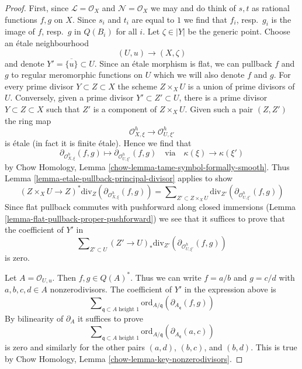 \begin{proof}
\medskip\noindent
First, since $\mathcal{L} = \mathcal{O}_X$ and $\mathcal{N} = \mathcal{O}_X$
we may and do think of $s, t$ as rational functions $f, g$ on $X$.
Since $s_i$ and $t_i$ are equal to $1$ we find that $f_i$, resp.\ $g_i$
is the image of $f$, resp.\ $g$ in $Q(B_i)$ for all $i$.
Let $\zeta \in |Y|$ be the generic point. Choose an
\'etale neighbourhood
$$
(U, u) \longrightarrow (X, \zeta)
$$
and denote $Y' = \overline{\{u\}} \subset U$.
Since an \'etale morphism is flat, we can pullback $f$ and $g$
to regular meromorphic functions on $U$ which we will also denote
$f$ and $g$.
For every prime divisor $Y \subset Z \subset X$ the scheme $Z \times_X U$
is a union of prime divisors of $U$. Conversely, given a prime divisor
$Y' \subset Z' \subset U$, there is a prime divisor
$Y \subset Z \subset X$ such that $Z'$ is a component of $Z \times_X U$.
Given such a pair $(Z, Z')$ the ring map
$$
\mathcal{O}_{X, \xi}^h \to \mathcal{O}_{U, \xi'}^h
$$
is \'etale (in fact it is finite \'etale). Hence we find that
$$
\partial_{\mathcal{O}_{X, \xi}^h}(f, g) \mapsto
\partial_{\mathcal{O}_{U, \xi'}^h}(f, g)
\quad\text{via}\quad
\kappa(\xi) \to \kappa(\xi')
$$
by Chow Homology, Lemma \ref{chow-lemma-tame-symbol-formally-smooth}.
Thus Lemma \ref{lemma-etale-pullback-principal-divisor} applies to show
$$
(Z \times_X U \to Z)^*\text{div}_Z(\partial_{\mathcal{O}_{X, \xi}^h}(f, g))
=
\sum\nolimits_{Z' \subset Z \times_X U}
\text{div}_{Z'}(\partial_{\mathcal{O}_{U, \xi'}^h}(f, g))
$$
Since flat pullback commutes with pushforward along closed
immersions (Lemma \ref{lemma-flat-pullback-proper-pushforward})
we see that it suffices to prove that the coefficient
of $Y'$ in
$$
\sum\nolimits_{Z' \subset U} 
(Z' \to U)_*\text{div}_{Z'}(\partial_{\mathcal{O}_{U, \xi'}^h}(f, g))
$$
is zero.

\medskip\noindent
Let $A = \mathcal{O}_{U, u}$. Then $f, g \in Q(A)^*$.
Thus we can write $f = a/b$ and $g = c/d$ with
$a, b, c, d \in A$ nonzerodivisors.
The coefficient of $Y'$ in the expression above is
$$
\sum\nolimits_{\mathfrak q \subset A\text{ height }1}
\text{ord}_{A/\mathfrak q}(\partial_{A_\mathfrak q}(f, g))
$$
By bilinearity of $\partial_A$ it suffices to prove
$$
\sum\nolimits_{\mathfrak q \subset A\text{ height }1}
\text{ord}_{A/\mathfrak q}(\partial_{A_\mathfrak q}(a, c))
$$
is zero and similarly for the other pairs $(a, d)$, $(b, c)$, and
$(b, d)$. This is true by
Chow Homology, Lemma \ref{chow-lemma-key-nonzerodivisors}.
\end{proof}











